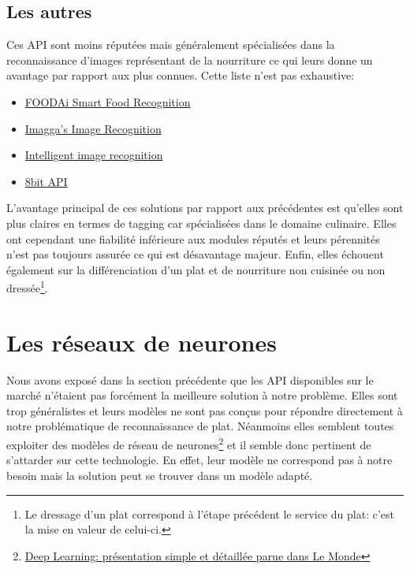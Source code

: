 \documentclass[a4paper,12pt]{report}
\begin{document}
      \subsection{Les autres}
      Ces API sont moins réputées mais généralement spécialisées dans la reconnaissance d'images représentant de la nourriture ce qui leurs donne un avantage par rapport aux plus connues. Cette liste n'est pas exhaustive:

      \bigbreak
      \begin{itemize}
        \item \href{<http://foodai.org/>}{FOODAi Smart Food Recognition}
        \item \href{<https://imagga.com/>}{Imagga's Image Recognition}
        \item \href{<http://restb.ai/>}{Intelligent image recognition}
        \item \href{<http://8bit.ai/>}{8bit API}
      \end{itemize}
      \bigbreak

      L'avantage principal de ces solutions par rapport aux précédentes est qu'elles sont plus claires en termes de tagging car spécialisées dans le domaine culinaire.
      \medbreak
      Elles ont cependant une fiabilité inférieure aux modules réputés et leurs pérennités n'est pas toujours assurée ce qui est désavantage majeur.
      \medbreak
      Enfin, elles échouent également sur la différenciation d'un plat et de nourriture non cuisinée ou non dressée\footnote{Le dressage d'un plat correspond à l'étape précédent le service du plat: c'est la mise en valeur de celui-ci.}.

    \section{Les réseaux de neurones}
    Nous avons exposé dans la section précédente que les API disponibles sur le marché n'étaient pas forcément la meilleure solution à notre problème. Elles sont trop généralistes et leurs modèles ne sont pas conçus pour répondre directement à notre problématique de reconnaissance de plat. 
    \medbreak
    Néanmoins elles semblent toutes exploiter des modèles de réseau de neurones\footnote{\href{<https://www.lemonde.fr/pixels/article/2015/07/24/comment-le-deep-learning-revolutionne-l-intelligence-artificielle_4695929_4408996.html>}{ Deep Learning: présentation simple et détaillée parue dans Le Monde}} et il semble donc pertinent de s'attarder sur cette technologie. En effet, leur modèle ne correspond pas à notre besoin mais la solution peut se trouver dans un modèle adapté.
    \bigbreak
\end{document}

